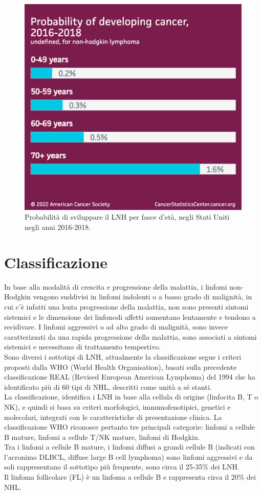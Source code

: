 \begin{figure}[H]
    \begin{center}
    \includegraphics[width=0.4\columnwidth]{img/Probabilityofdevelopingcancer.png}
    \end{center}
    \caption[Probabilità di sviluppare il LNH per fasce d’età, negli Stati Uniti negli anni 2016-2018.]{Probabilità di sviluppare il LNH per fasce d’età, negli Stati Uniti negli anni 2016-2018.
    \cite{img14}}

\end{figure}

\section{Classificazione}
In base alla modalità di crescita e progressione della malattia, i linfomi non-Hodgkin vengono suddivisi in 
linfomi indolenti o a basso grado di malignità, in cui c’è infatti una lenta progressione della malattia, 
non sono presenti sintomi sistemici e le dimensione dei linfonodi affetti aumentano lentamente e tendono a recidivare. 
I linfomi aggressivi o ad alto grado di malignità, sono invece caratterizzati da una rapida progressione della malattia, 
sono associati a sintomi sistemici e necessitano di trattamento tempestivo\cite{reteveneta}.\\

Sono diversi i sottotipi di LNH, attualmente la classificazione segue i criteri proposti dalla WHO 
(World Health Organisation), basati sulla precedente classificazione REAL (Revised European American Lymphoma) 
del 1994 che ha identificato più di 60 tipi di NHL, descritti come unità a sé stanti\cite{AIOM}.\\
La classificazione, identifica i LNH in base alla cellula di origine (linfocita B, T o NK), e quindi si basa su 
criteri morfologici, immunofenotipici, genetici e molecolari, integrati con le caratteristiche di presentazione clinica. 
La classificazione WHO riconosce pertanto tre principali categorie: linfomi a cellule B mature, linfomi a cellule T/NK
mature, linfomi di Hodgkin\cite{AIOM}.\\
Tra i linfomi a cellule B mature, i linfomi diffusi a grandi cellule B (indicati con l’acronimo DLBCL, 
diffuse large B cell lymphoma) sono linfomi aggressivi e da soli rappresentano il sottotipo più frequente, 
sono circa il 25-35\% dei LNH\cite{AIOM}.\\
Il linfoma follicolare (FL) è un linfoma a cellule B e rappresenta circa il 20\% dei NHL.\\

